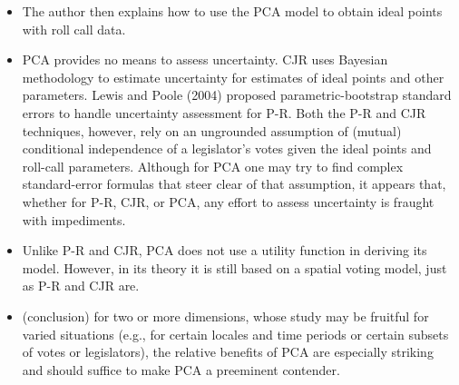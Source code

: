 \documentclass[a4paper,12pt]{article}
\begin{document}
\begin{enumerate}
\begin{itemize}
\item The author then explains how to use the PCA model to obtain ideal points with roll call data.  
\item PCA provides no means to assess uncertainty. CJR uses Bayesian methodology to estimate uncertainty for estimates of ideal points and other parameters. Lewis and Poole (2004) proposed parametric-bootstrap standard errors to handle uncertainty assessment for P-R. Both the P-R and CJR techniques, however, rely on an ungrounded assumption of (mutual) conditional independence of a legislator’s votes given the ideal points and roll-call parameters. Although for PCA one may try to find complex standard-error formulas that steer clear of that assumption, it appears that, whether for P-R, CJR, or PCA, any effort to assess uncertainty is fraught with impediments. 
\item Unlike P-R and CJR, PCA does not use a utility function in deriving its model. However, in its theory it is still based on a spatial voting model, just as P-R and CJR are. 
\item (conclusion) for two or more dimensions, whose study may be fruitful for varied situations (e.g., for certain locales and time periods or certain subsets of votes or legislators), the relative benefits of PCA are especially striking and should suffice to make PCA a preeminent contender. 
\end{itemize}


\end{enumerate}
\end{document}
